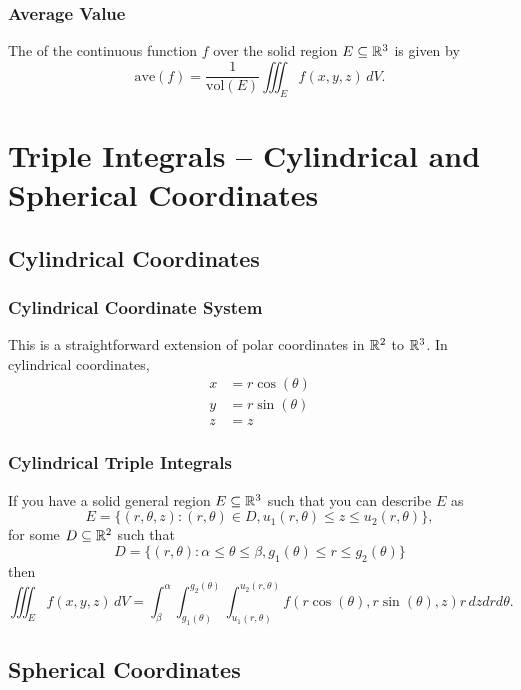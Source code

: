 \subsubsection{Average Value}

The  of the continuous function \(f\) over the solid region \(E \subseteq \mathbb{R}^3\) is given by
\[
  \text{ave}(f) = \frac{1}{\text{vol}(E)} \iiint_E f(x, y, z) \, dV.
\]

\newpage

\section{Triple Integrals -- Cylindrical and Spherical Coordinates}

\subsection{Cylindrical Coordinates}

\subsubsection{Cylindrical Coordinate System}

This is a straightforward extension of polar coordinates in \(\mathbb{R}^2\) to \(\mathbb{R}^3\). In cylindrical coordinates,
\begin{align*}
  x & = r \cos(\theta) \\
  y & = r \sin(\theta) \\
  z & = z
\end{align*}

\subsubsection{Cylindrical Triple Integrals}

If you have a solid general region \(E \subseteq \mathbb{R}^3\) such that you can describe \(E\) as
\[
  E = \{(r, \theta, z) : (r, \theta) \in D, u_1(r, \theta) \leq z \leq u_2(r, \theta)\},
\]
for some \(D \subseteq \mathbb{R}^2\) such that
\[
  D = \{(r, \theta) : \alpha \leq \theta \leq \beta, g_1(\theta) \leq r \leq g_2(\theta)\}
\]
then
\[
  \iiint_E f(x, y, z) \, dV = \int_{\beta}^{\alpha} \int_{g_1(\theta)}^{g_2(\theta)} \int_{u_1(r, \theta)}^{u_2(r, \theta)} f(r \cos(\theta), r \sin(\theta), z) r \, dz dr d\theta.
\]

\newpage

\subsection{Spherical Coordinates}

